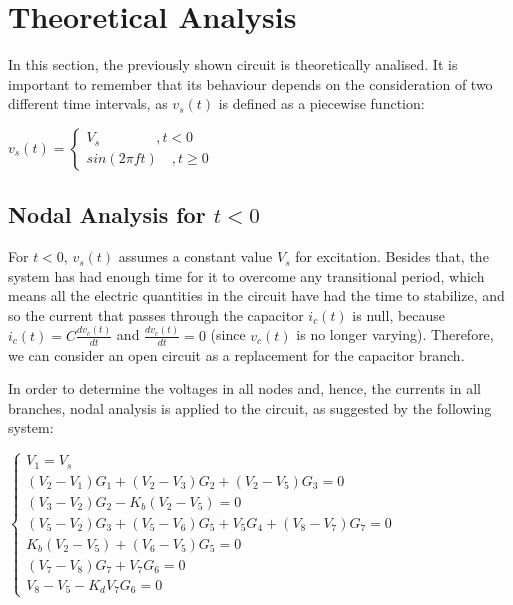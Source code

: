 \section{Theoretical Analysis}
\label{sec:theoretical}
\vspace{3mm}
In this section, the previously shown circuit is theoretically analised. It is important to remember that its behaviour depends on the consideration of two different time intervals, as $v_s(t)$ is defined as a piecewise function:
\vspace{3mm}


\begin{center}
$v_s(t) =\begin{cases} V_s \quad \quad \quad \quad ,t<0\\ sin(2\pi ft) \quad ,t \geq 0 \end{cases}$
\vspace{5mm}
\end{center}

\vspace{3mm}

\subsection{Nodal Analysis for $t<0$} \label{teo:2.1}
\vspace{3mm}

\par For $t<0$, $v_s(t)$ assumes a constant value $V_s$ for excitation. Besides that, the system has had enough time for it to overcome any transitional period, which means all the electric quantities in the circuit have had the time to stabilize, and so the current that passes through the capacitor $i_c(t)$ is null, because $i_c(t)=C\frac{dv_c(t)}{dt}$ and $\frac{dv_c(t)}{dt}=0$ (since $v_c(t)$ is no longer varying). Therefore, we can consider an open circuit as a replacement for the capacitor branch.

\vspace{3mm}
\par In order to determine the voltages in all nodes and, hence, the currents in all branches, nodal analysis is applied to the circuit, as suggested by the following system:

\begin{center}
  $\begin{cases} V_1=V_s  \\ (V_2-V_1)G_1 + (V_2-V_3)G_2 + (V_2-V_5)G_3=0 \\ (V_3-V_2)G_2 - K_b(V_2-V_5)=0 \\ (V_5-V_2)G_3 + (V_5-V_6)G_5 + V_5G_4 + (V_8-V_7)G_7 =0 \\ K_b(V_2-V_5)+(V_6-V_5)G_5=0 \\ (V_7-V_8)G_7 + V_7G_6 =0 \\ V_8-V_5 - K_dV_7G_6=0 \end{cases}$
\end{center}

